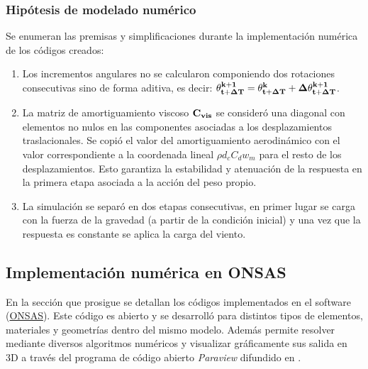
\subsubsection{Hipótesis de modelado numérico}\label{Sec:MET:HipotesisModeladoNumerico}
Se enumeran las premisas y simplificaciones durante la implementación numérica de los códigos creados: 
\begin{enumerate}
\item Los incrementos angulares no se calcularon componiendo dos rotaciones consecutivas sino de forma aditiva, es decir: $\bf{\theta_{t+\Delta T}^{k+1}}=\bf{\theta_{t+\Delta T}^{k}}+\bf{\Delta \theta_{t+\Delta T}^{k+1}}$.
\item La matriz de amortiguamiento viscoso $\bf{C}_{vis}$ se consideró una diagonal con elementos no nulos en las componentes asociadas a los desplazamientos traslacionales. Se copió el valor del amortiguamiento aerodinámico con el valor correspondiente a la coordenada lineal $\rho d_c C_d w_m$ para el resto de los desplazamientos. Esto garantiza la estabilidad y atenuación de la respuesta en la primera etapa asociada a la acción del peso propio.
\item La simulación se separó en dos etapas consecutivas, en primer lugar se carga con la fuerza de la gravedad (a partir de la condición inicial) y una vez que la respuesta es constante se aplica la carga del viento. 
\end{enumerate}  



\subsection{Implementación numérica en ONSAS}\label{Sec:MET:ImplementNumeric}
En la sección que prosigue se detallan los códigos implementados en el software (\href{https://github.com/ONSAS/ONSAS.m/}{ONSAS}). Este código es abierto y se desarrolló para distintos tipos de elementos, materiales y geometrías dentro del mismo modelo. Además permite resolver mediante diversos algoritmos numéricos y visualizar gráficamente sus salida en 3D a través del programa de código abierto \emph{Paraview} difundido en \citep{ahrens2005paraview}.

